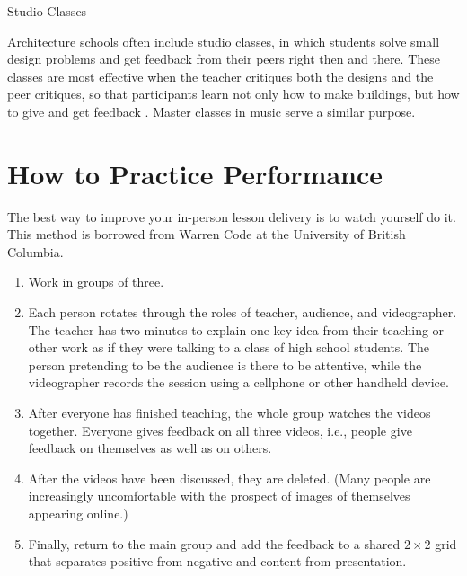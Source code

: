 \begin{callout}{Studio Classes}

  Architecture schools often include studio classes, in which students
  solve small design problems and get feedback from their peers right
  then and there. These classes are most effective when the teacher
  critiques both the designs and the peer critiques, so that
  participants learn not only how to make buildings, but how to give
  and get feedback \cite{Scho1984}. Master classes in music serve a
  similar purpose.

\end{callout}
  
\section{How to Practice Performance}\label{s:performance-practice}

The best way to improve your in-person lesson delivery is to watch
yourself do it.  This method is borrowed from Warren Code at the
University of British Columbia.

\begin{enumerate}

\item
  Work in groups of three.

\item
  Each person rotates through the roles of teacher, audience, and
  videographer. The teacher has two minutes to explain one key idea
  from their teaching or other work as if they were talking to a class
  of high school students. The person pretending to be the audience is
  there to be attentive, while the videographer records the session
  using a cellphone or other handheld device.

\item
  After everyone has finished teaching, the whole group watches the
  videos together. Everyone gives feedback on all three videos, i.e.,
  people give feedback on themselves as well as on others.

\item
  After the videos have been discussed, they are deleted.  (Many
  people are increasingly uncomfortable with the prospect of images of
  themselves appearing online.)

\item
  Finally, return to the main group and add the feedback to a shared
  $2{\times}2$ grid that separates positive from negative and content
  from presentation.

\end{enumerate}

